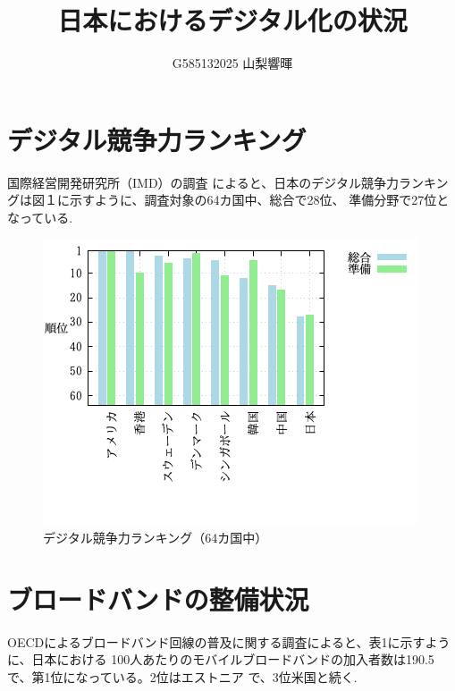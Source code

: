 \documentclass[a4paper,11pt,dvipdfmx]{ujarticle}
\title{日本におけるデジタル化の状況}
\author{G585132025 山梨響暉}
\begin{document}
\maketitle %

\section{デジタル競争力ランキング}

国際経営開発研究所（IMD）の調査 \cite{IMD}によると、日本のデジタル競争力ランキングは図１に示すように、調査対象の64カ国中、総合で28位、
準備分野で27位となっている.

\begin{figure}[htbp]
    \centering
    \includegraphics[width=0.7\linewidth]{G58513.png}
    \caption{デジタル競争力ランキング（64カ国中）}
\end{figure}

\section{ブロードバンドの整備状況}

OECDによるブロードバンド回線の普及に関する調査\cite{oecd}によると、表1に示すように、日本における 100人あたりのモバイルブロードバンドの加入者数は190.5で、第1位になっている。2位はエストニア
で、3位米国と続く.
\end{document}
